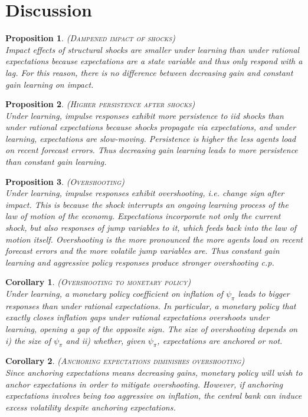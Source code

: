\documentclass[11pt]{article}
\renewcommand{\[}{\begin{equation}}
\renewcommand{\]}{\end{equation}}
\newtheorem{prop}{Proposition}
\newtheorem{corollary}{Corollary}
\begin{document}
\section{Discussion}
	\begin{prop} \textsc{(Dampened impact of shocks)} \\
	Impact effects of structural shocks are smaller under learning than under rational expectations because expectations are a state variable and thus only respond with a lag. For this reason, there is no difference between decreasing gain and constant gain learning on impact.
	\end{prop}
	\begin{prop} \textsc{(Higher persistence after shocks)} \\
	Under learning, impulse responses exhibit more persistence to iid shocks than under rational expectations because shocks propagate via expectations, and under learning, expectations are slow-moving. Persistence is higher the less agents load on recent forecast errors. Thus decreasing gain learning leads to more persistence than constant gain learning. 
	\end{prop}
	\begin{prop} \textsc{(Overshooting)} \\
	Under learning, impulse responses exhibit overshooting, i.e. change sign after impact. This is because the shock interrupts an ongoing learning process of the law of motion of the economy. Expectations incorporate not only the current shock, but also responses of jump variables to it, which feeds back into the law of motion itself. Overshooting is the more pronounced the more agents load on recent forecast errors and the more volatile jump variables are. Thus constant gain learning and aggressive policy responses produce stronger overshooting c.p. 
	\end{prop}
	\begin{corollary} \textsc{(Overshooting to monetary policy)} \\
	Under learning, a monetary policy coefficient on inflation of $\psi_{\pi}$ leads to bigger responses than under rational expectations. In particular, a monetary policy that exactly closes inflation gaps under rational expectations overshoots under learning, opening a gap of the opposite sign. The size of overshooting depends on i) the size of $\psi_{\pi}$ and ii) whether, given $\psi_{\pi}$, expectations are anchored or not. 
	\end{corollary}
	\begin{corollary} \textsc{(Anchoring expectations diminishes overshooting)} \\
	Since anchoring expectations means decreasing gains, monetary policy will wish to anchor expectations in order to mitigate overshooting. However, if anchoring expectations involves being too aggressive on inflation, the central bank can induce excess volatility despite anchoring expectations. 	\end{corollary}
\end{document}
